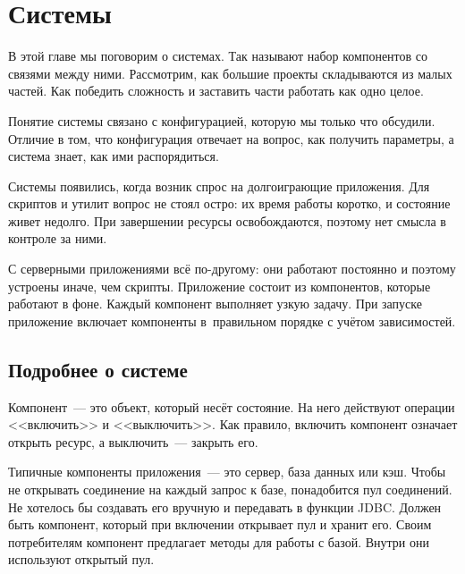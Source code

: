 \chapter{Системы}

\label{chapter-systems}


\begin{teaser}
В этой главе мы поговорим о системах. Так называют набор компонентов со связями
между ними. Рассмотрим, как большие проекты складываются из малых частей. Как
победить сложность и заставить части работать как одно целое.
\end{teaser}

Понятие системы связано с конфигурацией, которую мы только что обсудили. Отличие
в том, что конфигурация отвечает на вопрос, как получить параметры, а система
знает, как ими распорядиться.

Системы появились, когда возник спрос на долгоиграющие приложения. Для скриптов
и утилит вопрос не стоял остро: их время работы коротко, и состояние живет
недолго. При завершении ресурсы освобождаются, поэтому нет смысла в контроле за
ними.

С серверными приложениями всё по-дру\-го\-му: они работают постоянно и поэтому
устроены иначе, чем скрипты. Приложение состоит из компонентов, которые работают
в фоне. Каждый компонент выполняет узкую задачу. При запуске приложение включает
компоненты в~правильном порядке с учётом зависимостей.

\section{Подробнее о системе}


Компонент~--- это объект, который несёт состояние. На него действуют операции
<<включить>> и <<выключить>>. Как правило, включить компонент означает открыть
ресурс, а выключить~--- закрыть его.


Типичные компоненты приложения~--- это сервер, база данных или кэш. Чтобы не
открывать соединение на каждый запрос к базе, понадобится пул соединений. Не
хотелось бы создавать его вручную и передавать в функции JDBC. Должен быть
компонент, который при включении открывает пул и хранит его. Своим потребителям
компонент предлагает методы для работы с базой. Внутри они используют открытый
пул.


